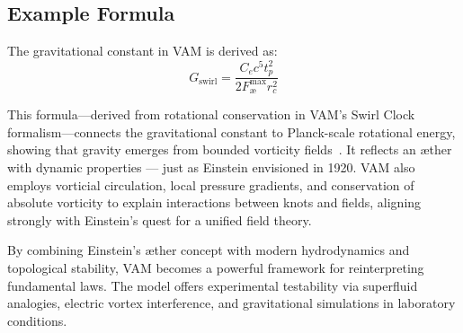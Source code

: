    \subsection*{Example Formula}

    The gravitational constant in VAM is derived as:
    \begin{equation}
        G_\text{swirl} = \frac{C_e c^5 t_p^2}{2 F^{\text{max}}_{\text{\ae}} r_c^2}
    \end{equation}

        This formula—derived from rotational conservation in VAM's Swirl Clock formalism—connects the gravitational constant to Planck-scale rotational energy, showing that gravity emerges from bounded vorticity fields~\cite{iskandarani2024vam2}. It reflects an æther with dynamic properties — just as Einstein envisioned in 1920. VAM also employs vorticial circulation, local pressure gradients, and conservation of absolute vorticity to explain interactions between knots and fields, aligning strongly with Einstein's quest for a unified field theory.

    By combining Einstein's æther concept with modern hydrodynamics and topological stability, VAM becomes a powerful framework for reinterpreting fundamental laws. The model offers experimental testability via superfluid analogies, electric vortex interference, and gravitational simulations in laboratory conditions.
